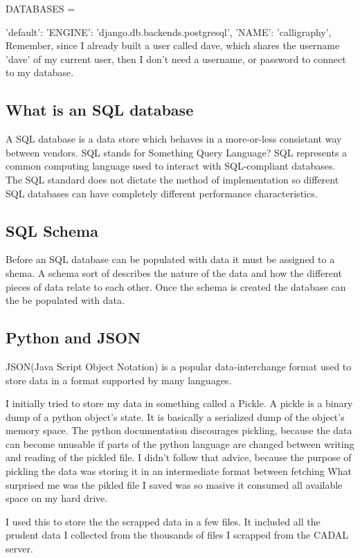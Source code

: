 DATABASES = {
    'default': {
        'ENGINE': 'django.db.backends.postgresql',
        'NAME': 'calligraphy',
    }
Remember, since I already built a user called dave, which shares the username 'dave' of my current user, then I don't need a username, or password to connect to my database.


\subsection{What is an SQL database}

A SQL database is a data store which behaves in a more-or-less consistant way between vendors.  SQL stands for Something Query Language?  SQL represents a common computing language used to interact with SQL-compliant databases.  The SQL standard does not dictate the method of implementation so different SQL databases can have completely different performance characteristics.

\subsection{SQL Schema}

Before an SQL database can be populated with data it must be assigned to a shema.  A schema sort of describes the nature of the data and how the different pieces of data relate to each other.  Once the schema is created the database can the be populated with data.


\subsection{Python and JSON}
JSON(Java Script Object Notation) is a popular data-interchange format used to store data in a format supported by many languages.

I initially tried to store my data in something called a Pickle.  A pickle is a binary dump of a python object's state.  It is basically a serialized dump of the object's memory space.  The python documentation discourages pickling, because the data can become unusable if parts of the python language are changed between writing and reading of the pickled file.  I didn't follow that advice, because the purpose of pickling the data was storing it in an intermediate format between fetching   What surprised me was the pikled file I saved was so masive it consumed all available space on my hard drive.  

I used this to store the the scrapped data in a few files.  It included all the prudent data I collected from the thousands of files I scrapped from the CADAL server.

}
